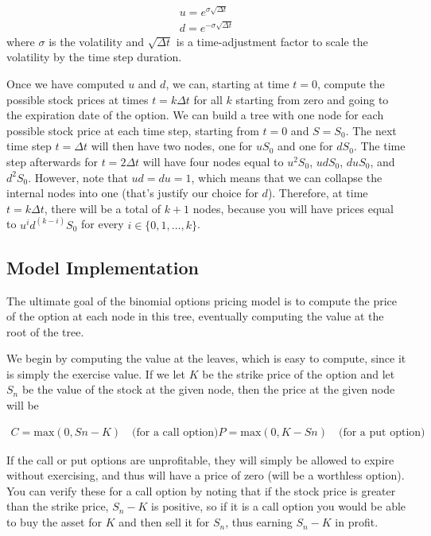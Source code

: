 \begin{equation}
\begin{gathered}
u = e^{\sigma\sqrt{\Delta t}}\\
d = e^{-\sigma\sqrt{\Delta t}}
\end{gathered}
\end{equation}
where $\sigma$ is the volatility and $\sqrt{\Delta t}$ is a time-adjustment factor to scale the volatility by the time step duration.

Once we have computed $u$ and $d$, we can, starting at time $t = 0$, compute the possible stock prices
at times $t = k\Delta t$ for all $k$ starting from zero and going to the expiration date of the option. We can build
a tree with one node for each possible stock price at each time step, starting from $t = 0$ and $S = S_0$. The
next time step $t = \Delta t$ will then have two nodes, one for $uS_0$ and one for $dS_0$. The time step afterwards
for $t = 2\Delta t$ will have four nodes equal to $u^2 S_0$, $udS_0$, $duS_0$, and $d^2 S_0$. 
However, note that $ud = du = 1$, which means that we can collapse the internal nodes into one (that's justify our choice for $d$). Therefore, at time $t = k\Delta t$, there will be a total of $k + 1$ nodes, because you will have prices equal to $u^i d^{(k−i)} S_0$ for every $i \in \{0, 1,\dots , k\}$.

\subsection{Model Implementation}
The ultimate goal of the binomial options pricing model is to compute the price of the option at
each node in this tree, eventually computing the value at the root of the tree. 

We begin by computing the value at the leaves, which is easy to compute, since it is simply the exercise value.
If we let $K$ be the strike price of the option and let $S_n$ be the value of the stock at the given node, then
the price at the given node will be

\begin{equation}
	\begin{gathered}
C = \textrm{max} (0, Sn − K)\quad \textrm{(for a call option)}
P = \textrm{max} (0, K − Sn)\quad \textrm{(for a put option)}
	\end{gathered}
\end{equation}

If the call or put options are unprofitable, they will simply be allowed to expire without exercising, and
thus will have a price of zero (will be a worthless option). You can verify these for a call option by noting
that if the stock price is greater than the strike price, $S_n − K$ is positive, so if it is a call option you would
be able to buy the asset for $K$ and then sell it for $S_n$, thus earning $S_n − K$ in profit.

